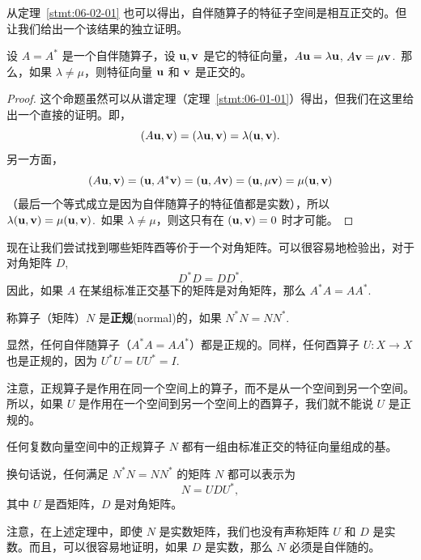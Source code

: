 从定理~\ref{stmt:06-02-01} 也可以得出，自伴随算子的特征子空间是相互正交的。但让我们给出一个该结果的独立证明。

\begin{proposition}\label{stmt:06-02-03}
设 $A = A^*$ 是一个自伴随算子，设 $\mathbf{u}, \mathbf{v}$ 是它的特征向量，$A\mathbf{u} = \lambda \mathbf{u}$, $A\mathbf{v} = \mu \mathbf{v}$.~那么，如果 $\lambda \neq \mu$，则特征向量 $\mathbf{u}$ 和 $\mathbf{v}$ 是正交的。
\end{proposition}

\begin{proof}这个命题虽然可以从谱定理（定理~\ref{stmt:06-01-01}）得出，但我们在这里给出一个直接的证明。即，$$(A\mathbf{u}, \mathbf{v}) = (\lambda \mathbf{u}, \mathbf{v}) = \lambda(\mathbf{u}, \mathbf{v}).$$
另一方面，$$(A\mathbf{u}, \mathbf{v}) = (\mathbf{u}, A^*\mathbf{v}) = (\mathbf{u}, A\mathbf{v}) = (\mathbf{u}, \mu \mathbf{v}) = \mu(\mathbf{u}, \mathbf{v})$$
（最后一个等式成立是因为自伴随算子的特征值都是实数），所以 $\lambda(\mathbf{u}, \mathbf{v}) = \mu(\mathbf{u}, \mathbf{v})$.~如果 $\lambda \neq \mu$，则这只有在 $(\mathbf{u}, \mathbf{v}) = 0$ 时才可能。\end{proof}

现在让我们尝试找到哪些矩阵酉等价于一个对角矩阵。可以很容易地检验出，对于对角矩阵 $D$,
$$D^*D = DD^*.$$
因此，如果 $A$ 在某组标准正交基下的矩阵是对角矩阵，那么 $A^*A = AA^*$.~

\begin{definition*}
称算子（矩阵）$N$ 是\textbf{正规}(normal)的，如果 $N^*N = NN^*$.~
\end{definition*}

显然，任何自伴随算子（$A^*A = AA^*$）都是正规的。同样，任何酉算子 $U: X \to X$ 也是正规的，因为 $U^*U = UU^* = I$.~

注意，正规算子是作用在同一个空间上的算子，而不是从一个空间到另一个空间。所以，如果 $U$ 是作用在一个空间到另一个空间上的酉算子，我们就不能说 $U$ 是正规的。

\begin{theorem}\label{stmt:06-02-04} 任何复数向量空间中的正规算子 $N$ 都有一组由标准正交的特征向量组成的基。

换句话说，任何满足 $N^*N = NN^*$ 的矩阵 $N$ 都可以表示为 $$N = UDU^*,$$
其中 $U$ 是酉矩阵，$D$ 是对角矩阵。\end{theorem}

\begin{remark*}
注意，在上述定理中，即使 $N$ 是实数矩阵，我们也没有声称矩阵 $U$ 和 $D$ 是实数。而且，可以很容易地证明，如果 $D$ 是实数，那么 $N$ 必须是自伴随的。
\end{remark*}


